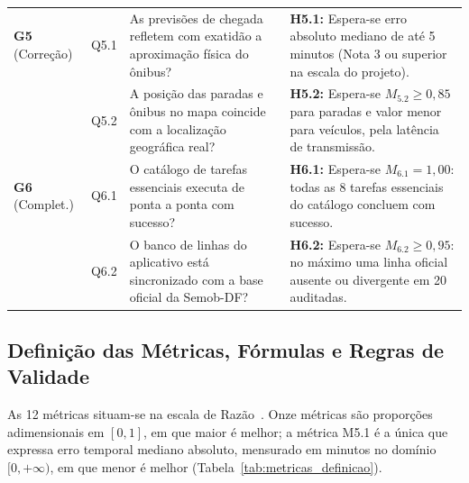 \documentclass[11pt,a4paper]{article}
\begin{document}
\begin{table}[!htbp]
\begin{tabularx}{\textwidth}{l c X X}
\midrule
\textbf{G5} (Correção) & Q5.1 & As previsões de chegada refletem com exatidão a aproximação física do ônibus? & \textbf{H5.1:} Espera-se erro absoluto mediano de até 5 minutos (Nota 3 ou superior na escala do projeto). \\
& Q5.2 & A posição das paradas e ônibus no mapa coincide com a localização geográfica real? & \textbf{H5.2:} Espera-se $M_{5.2} \ge 0{,}85$ para paradas e valor menor para veículos, pela latência de transmissão. \\
\midrule
\textbf{G6} (Complet.) & Q6.1 & O catálogo de tarefas essenciais executa de ponta a ponta com sucesso? & \textbf{H6.1:} Espera-se $M_{6.1} = 1{,}00$: todas as 8 tarefas essenciais do catálogo concluem com sucesso. \\
& Q6.2 & O banco de linhas do aplicativo está sincronizado com a base oficial da Semob-DF? & \textbf{H6.2:} Espera-se $M_{6.2} \ge 0{,}95$: no máximo uma linha oficial ausente ou divergente em 20 auditadas. \\
\bottomrule
\end{tabularx}
\end{table}

\subsection{Definição das Métricas, Fórmulas e Regras de Validade}
\label{sec:metricas_detalhe}

As 12 métricas situam-se na escala de Razão~\cite{stevens1946,fenton2014}. Onze métricas são proporções adimensionais em $[0, 1]$, em que maior é melhor; a métrica M5.1 é a única que expressa erro temporal mediano absoluto, mensurado em minutos no domínio $[0, +\infty)$, em que menor é melhor (Tabela~\ref{tab:metricas_definicao}).
\end{document}

